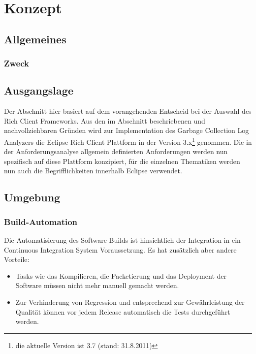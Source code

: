 \chapter{Konzept}
\section{Allgemeines}
\subsection{Zweck}

\section{Ausgangslage}
Der Abschnitt hier basiert auf dem vorangehenden Entscheid bei der Auswahl des Rich Client Frameworks. Aus den im Abschnitt  beschriebenen und nachvollziehbaren Gründen wird zur Implementation des Garbage Collection Log Analyzers die Eclipse Rich Client Plattform in der Version 3.x\footnote{die aktuelle Version ist 3.7 (stand: 31.8.2011)} genommen. Die in der Anforderungsanalyse allgemein definierten Anforderungen werden nun spezifisch auf diese Plattform konzipiert, für die einzelnen Thematiken werden nun auch die Begrifflichkeiten innerhalb Eclipse verwendet.


\section{Umgebung}
\subsection{Build-Automation}
Die Automatisierung des Software-Builds ist hinsichtlich der Integration in ein Continuous Integration System Voraussetzung. Es hat zusätzlich aber andere Vorteile:
\begin{itemize}
	\item Tasks wie das Kompilieren, die Packetierung und das Deployment der Software müssen nicht mehr manuell gemacht werden.
	\item Zur Verhinderung von Regression und entsprechend zur Gewährleistung der Qualität können vor jedem Release automatisch die Tests durchgeführt werden.
\end{itemize}


